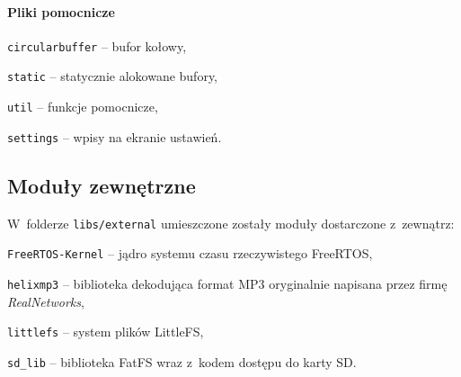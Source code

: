 \documentclass[polish]{aghengthesis}
\let\tempone\itemize
\let\temptwo\enditemize
\renewenvironment{itemize}{\tempone\setlength{\itemsep}{0cm}}{\temptwo}
\begin{document}
			\paragraph{Pliki pomocnicze}
				\begin{itemize}
					\item \lstinline|circularbuffer| -- bufor kołowy,
					\item \lstinline|static| -- statycznie alokowane bufory,
					\item \lstinline|util| -- funkcje pomocnicze,
					\item \lstinline|settings| -- wpisy na ekranie ustawień.
				\end{itemize}
	
		\subsection{Moduły zewnętrzne}
		W~folderze \lstinline|libs/external| umieszczone zostały moduły dostarczone z~zewnątrz:
		\begin{itemize}
			\item \lstinline|FreeRTOS-Kernel| -- jądro systemu czasu rzeczywistego FreeRTOS\textsuperscript{\cite{freertos_kernel}},
			\item \lstinline|helixmp3| -- biblioteka dekodująca format MP3\textsuperscript{\cite{helixmp3_repo}} oryginalnie napisana przez firmę \textit{RealNetworks}\textsuperscript{\cite{realnetworks}},
			\item \lstinline|littlefs| -- system plików LittleFS\textsuperscript{\cite{littlefs}},
			\item \lstinline|sd_lib| -- biblioteka FatFS\textsuperscript{\cite{fatfs}} wraz z~kodem dostępu do karty SD\textsuperscript{\cite{sdfs}}.
		\end{itemize}
\end{document}
